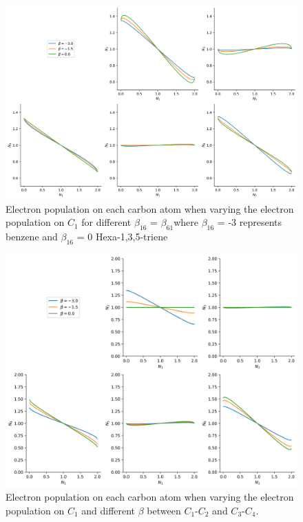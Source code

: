 \documentclass[twoside,twocolumn,9pt]{article}
\begin{document}
\begin{center}
  \begin{figure}[!htbp]
      \includegraphics[width=\textwidth]{Benzene-electronpopulation-on-atoms-potential-and-one-adjacent-beta.png}
      \caption{Electron population on each carbon atom when varying the electron population on $C_1$ for different $\beta_{16}$ = $\beta_{61}$where $\beta_{16}$ = -3 represents benzene and $\beta_{16}$ = 0 Hexa-1,3,5-triene}
      \label{pericyclic-electronpopulation}
  \end{figure}
\end{center}

\begin{center}
  \begin{figure}[!htbp]
      \includegraphics[width=\textwidth]{Benzene-electronpopulation-on-atoms-potential-and-two-betas-to-zero-adjacent.png}
      \caption{Electron population on each carbon atom when varying the electron population on $C_1$ and different $\beta$ between $C_1$-$C_2$ and $C_3$-$C_4$.}
      \label{Diels-alder-1-electronpopulation}
  \end{figure}
\end{center}
\end{document}

